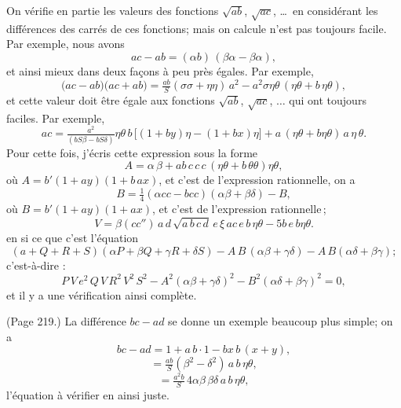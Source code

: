 \documentclass[11pt,a4paper]{article}
\theoremstyle{plain}
\theoremstyle{definition}
\begin{document}
On v\'erifie en partie les valeurs des fonctions $\sqrt{ab}$, $\sqrt{ac}$, \ldots\ en consid\'erant les diff\'erences des carr\'es de ces fonctions; mais on calcule n'est pas toujours facile. Par exemple, nous avons
\[
ac - ab = (\alpha b)\,(\beta\alpha - \beta\alpha),
\]
et ainsi mieux dans deux fa\c{c}ons \`a peu pr\`es \'egales. Par exemple,
\[
\big(ac - ab\big)\big(ac + ab\big) = \tfrac{a b}{S} (\sigma\sigma + \eta\eta)\,a^2 - a^2 \sigma\eta\theta\,(\eta\theta + b\,\eta\theta),
\]
et cette valeur doit \^etre \'egale aux fonctions $\sqrt{a b}$, $\sqrt{a c}$, $\ldots$ qui ont toujours faciles. Par exemple,
\[
ac = \tfrac{a^2}{(b S\beta - b S\delta)}\eta\theta\,b\,\big[(1 + by)\eta - (1 + bx)\eta\big] + a\,(\eta\theta + b\eta\theta)\,a\,\eta\,\theta.
\]
Pour cette fois, j'\'ecris cette expression sous la forme
\[
A = \alpha\,\beta + ab\,c\,c\,c\,(\eta\theta + b\,\theta\theta)\eta\theta,
\]
o\`u $A = b'(1 + a y)(1 + b\,a x)$, et c'est de l'expression rationnelle, on a
\[
B = \tfrac{1}{4} (\alpha c c - b c c)(\alpha\beta + \beta\delta) - B,
\]
o\`u $B = b'(1 + a y)(1 + a x)$, et c'est de l'expression rationnelle\,;
\[
V = \beta(c c'')\,a\,d\,\sqrt{a\,b\,c\,d}\,e\,\xi\,a c\,e\,b\,\eta\theta - 5 b\,e\,b\eta\theta.
\]
en si ce que c'est l'\'equation
\[
(a + Q + R + S)(\alpha P + \beta Q + \gamma R + \delta S) - A\,B\,(\alpha\beta + \gamma\delta) - A\,B (\alpha\delta + \beta\gamma);
\]
c'est-\`a-dire :
\[
P\,V\,e^2\,Q\,V\,R^2\,V^2\,S^2 - A^2(\alpha\beta + \gamma\delta)^2 - B^2(\alpha\delta + \beta\gamma)^2 = 0,
\]
et il y a une v\'erification ainsi compl\`ete.

\medskip

\noindent (Page 219.) La diff\'erence $bc - ad$ se donne un exemple beaucoup plus simple; on a
\[
bc - ad = 1 + a\,b \cdot 1 - bx\,b\,(x + y),
\]
\[
= \tfrac{a b}{S} (\beta^2 - \delta^2)\,a\,b\,\eta\theta,
\]
\[
= \tfrac{a^2 b}{S}\,4 \alpha\beta\,\beta\delta\,a\,b\,\eta\theta,
\]
l'\'equation \`a v\'erifier en ainsi juste.

\medskip
\end{document}
